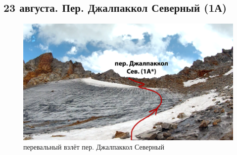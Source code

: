 \subsection{23 августа.  Пер. Джалпаккол Северный (1А)}

\begin{figure}[h!]
	\centering
	\includegraphics[width=0.7\linewidth]{../pics/dzh_1}
	\caption{перевальный взлёт пер. Джалпаккол Северный}
	\label{fig:dzh_1}
\end{figure}


\newpage